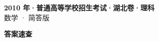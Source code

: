 \documentclass[zihao=-4, a4paper]{ctexart}
\begin{document}
\begin{center}
  {\Large\bfseries 2010 年·普通高等学校招生考试·湖北卷·理科}\\[4pt]
  {\large 数学 · 简答版}
\end{center}
\medskip
{}

\clearpage
{}
\begin{center}{\Large\bfseries 答案速查}\end{center}
\medskip

\end{document}
